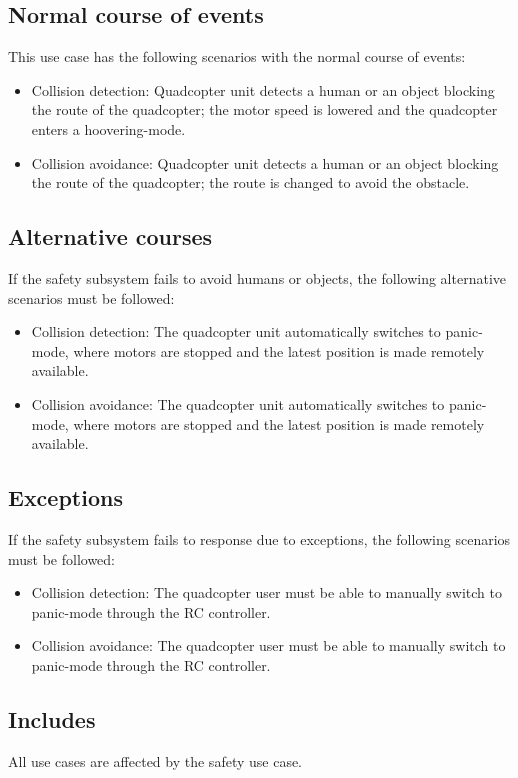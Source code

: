 \documentclass[a4paper]{article}
\begin{document}
\subsection{Normal course of events}
This use case has the following scenarios with the normal course of events:
\begin{itemize}
\item Collision detection: Quadcopter unit detects a human or an object blocking the route of the quadcopter; the motor speed is lowered and the quadcopter enters a hoovering-mode.
\item Collision avoidance: Quadcopter unit detects a human or an object blocking the route of the quadcopter; the route is changed to avoid the obstacle.
\end{itemize}
\subsection{Alternative courses}
If the safety subsystem fails to avoid humans or objects, the following alternative scenarios must be followed:
\begin{itemize}
\item Collision detection: The quadcopter unit automatically switches to panic-mode, where motors are stopped and the latest position is made remotely available. 
\item Collision avoidance: The quadcopter unit automatically switches to panic-mode, where motors are stopped and the latest position is made remotely available.
\end{itemize}

\subsection{Exceptions}
If the safety subsystem fails to response due to exceptions, the following scenarios must be followed:
\begin{itemize}
\item Collision detection: The quadcopter user must be able to manually switch to panic-mode through the RC controller.
\item Collision avoidance: The quadcopter user must be able to manually switch to panic-mode through the RC controller.
\end{itemize}
\subsection{Includes}
All use cases are affected by the safety use case.
\end{document}
